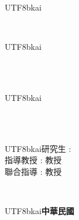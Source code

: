 
\onehalfspace
\begin{titlepage}
	\begin{center}
		{\fontsize{40}{50}\selectfont 
				\begin{CJK}{UTF8}{bkai}\universityCH \end{CJK}}\\
		\vspace{10mm}
		{\fontsize{35}{45}\selectfont  \begin{CJK}{UTF8}{bkai} 
				\departmentCH \end{CJK}}\\
		\vspace{10mm}
		{\fontsize{35}{45}}\\
		\vspace{20mm}
		{\huge \begin{CJK}{UTF8}{bkai}\titleCH \end{CJK}}\\
		\vspace{10mm}
		{\huge \titleEN }\\
		\vspace{60mm}
	\end{center}
	\begin{flushleft}
	{\Large \begin{CJK}{UTF8}{bkai}\hspace{1em}研究生 : \nameCH  \hfill \nameEN \\ \Large 指導教授 : \AdvisorNameCH \hspace{1em} 教授 \hfill \AdvisorNameEN \\ \Large 聯合指導 : \CoAdvisorNameCH \hspace{1em} 教授 \hfill \CoAdvisorNameEN \end{CJK}}\\
	\vspace{20mm}
	\end{flushleft}
	\vspace*{\fill}
	\begin{center}
		{\normalsize{ \begin{CJK}{UTF8}{bkai}\textbf{中華民國\SubmitTimeCH} \end{CJK}}}
	\end{center}
\end{titlepage}

